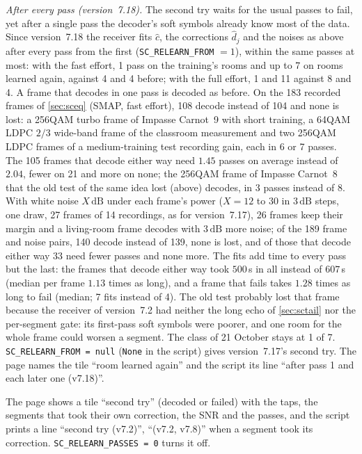 \documentclass[11pt,a4paper]{article}
\newcommand{\dB}{\,\mathrm{dB}}
\newcommand{\code}[1]{\texttt{#1}}
\theoremstyle{remark}
\begin{document}
\emph{After every pass (version~7.18).} The second try waits for the usual passes to fail, yet after a single pass the decoder's soft symbols already know most of the data. Since version~7.18 the receiver fits $\hat c$, the corrections $\hat d_j$ and the noises as above after every pass from the first (\code{SC\_RELEARN\_FROM} $= 1$), within the same passes at most: with the fast effort, 1 pass on the training's rooms and up to 7 on rooms learned again, against 4 and 4 before; with the full effort, 1 and 11 against 8 and 4. A frame that decodes in one pass is decoded as before. On the 183 recorded frames of \cref{sec:sceq} (SMAP, fast effort), 108 decode instead of 104 and none is lost: a 256QAM turbo frame of Impasse Carnot~9 with short training, a 64QAM LDPC $2/3$ wide-band frame of the classroom measurement and two 256QAM LDPC frames of a medium-training test recording gain, each in 6 or 7 passes. The 105 frames that decode either way need $1.45$ passes on average instead of $2.04$, fewer on 21 and more on none; the 256QAM frame of Impasse Carnot~8 that the old test of the same idea lost (above) decodes, in 3 passes instead of 8. With white noise $X\dB$ under each frame's power ($X = 12$ to 30 in $3\dB$ steps, one draw, 27 frames of 14 recordings, as for version~7.17), 26 frames keep their margin and a living-room frame decodes with $3\dB$ more noise; of the 189 frame and noise pairs, 140 decode instead of 139, none is lost, and of those that decode either way 33 need fewer passes and none more. The fits add time to every pass but the last: the frames that decode either way took $500$\,s in all instead of $607$\,s (median per frame $1.13$ times as long), and a frame that fails takes $1.28$ times as long to fail (median; 7 fits instead of 4). The old test probably lost that frame because the receiver of version~7.2 had neither the long echo of \cref{sec:sctail} nor the per-segment gate: its first-pass soft symbols were poorer, and one room for the whole frame could worsen a segment. The class of 21 October stays at 1 of 7. \code{SC\_RELEARN\_FROM = null} (\code{None} in the script) gives version~7.17's second try. The page names the tile ``room learned again'' and the script its line ``after pass 1 and each later one (v7.18)''.

The page shows a tile ``second try'' (decoded or failed) with the taps, the segments that took their own correction, the SNR and the passes, and the script prints a line ``second try (v7.2)'', ``(v7.2, v7.8)'' when a segment took its correction. \code{SC\_RELEARN\_PASSES = 0} turns it off.
\end{document}

